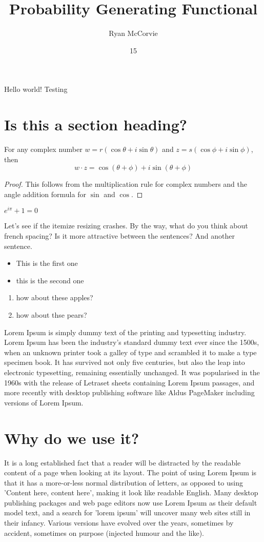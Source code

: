 \documentclass[notes]{mccorvienotes}
\title{Probability Generating Functional}
\author{Ryan McCorvie}
\date{15}{10}{2017}
\begin{document}
Hello world!  Testing

\section{Is this a section heading?}


\begin{theorem}
	For any complex number $w=r(\cos \theta + i \sin \theta)$ and $z=s(\cos \phi + i\sin \phi)$, then
	\[
		w \cdot z = \cos(\theta+\phi) + i \sin(\theta+\phi)
	\]
\end{theorem}
\begin{proof}
This follows from the multiplication rule for complex numbers and the angle addition formula for $\sin$ and $\cos$.
\end{proof}

\begin{corollary} $e^{i \pi} + 1 = 0$
\end{corollary}	


Let's see if the itemize resizing crashes.  By the way, what do you think about french spacing?  Is it more attractive between the sentences?  And another sentence.
\begin{itemize}
	\item This is the first one
	\item this is the second one
\end{itemize}

\begin{enumerate}
	\item how about these apples?
	\item how about thse pears?
\end{enumerate}

Lorem Ipsum is simply dummy text of the printing and typesetting industry. Lorem Ipsum has been the industry's standard dummy text ever since the 1500s, when an unknown printer took a galley of type and scrambled it to make a type specimen book. It has survived not only five centuries, but also the leap into electronic typesetting, remaining essentially unchanged. It was popularised in the 1960s with the release of Letraset sheets containing Lorem Ipsum passages, and more recently with desktop publishing software like Aldus PageMaker including versions of Lorem Ipsum.



\section{Why do we use it?}
It is a long established fact that a reader will be distracted by the readable content of a page when looking at its layout. The point of using Lorem Ipsum is that it has a more-or-less normal distribution of letters, as opposed to using 'Content here, content here', making it look like readable English. Many desktop publishing packages and web page editors now use Lorem Ipsum as their default model text, and a search for 'lorem ipsum' will uncover many web sites still in their infancy. Various versions have evolved over the years, sometimes by accident, sometimes on purpose (injected humour and the like).
\end{document}
